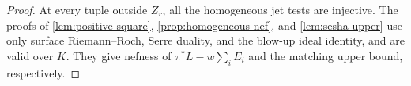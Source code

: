 \begin{proof}
At every tuple outside $Z_r$, all the homogeneous jet tests are injective. The proofs of \cref{lem:positive-square}, \cref{prop:homogeneous-nef}, and \cref{lem:sesha-upper} use only surface Riemann--Roch, Serre duality, and the blow-up ideal identity, and are valid over $K$. They give nefness of $\pi^*L-w\sum_iE_i$ and the matching upper bound, respectively.
\end{proof}
